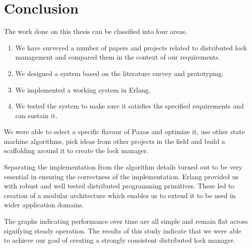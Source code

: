 \chapter{Conclusion}
\label{chapter:conclusion}

The work done on this thesis can be classified into four areas.

\begin{enumerate}
  \item We have surveyed a number of papers and projects related to distributed
    lock management and compared them in the context of our requirements.
  \item We designed a system based on the literature survey and prototyping.
  \item We implemented a working system in Erlang.
  \item We tested the system to make sure it satisfies the specified
    requirements and can sustain it.
\end{enumerate}

We were able to select a specific flavour of Paxos and optimize it, use other
state machine algorithms, pick ideas from other projects in the field and build
a scaffolding around it to create the lock manager.

Separating the implementation from the algorithm details turned out
to be very essential in ensuring the correctness of the implementation. Erlang
provided us with robust and well tested distributed programming primitives.
These led to creation of a modular architecture which enables us to extend
it to be used in wider application domains.

The graphs indicating performance over time are all simple and remain flat
across signifying steady operation. The results of this study indicate that
we were able to achieve our goal of creating a strongly consistent
distributed lock manager.

